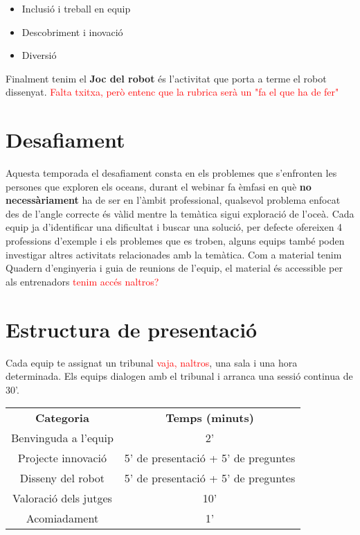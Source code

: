 \documentclass{article}
\newcommand\dubtes[1]{\textcolor{red}{#1}}
\begin{document}
\begin{itemize}
    \item Inclusió i treball en equip
    \item Descobriment i inovació
    \item Diversió
\end{itemize}

Finalment tenim el \textbf{Joc del robot} és l'activitat que porta a terme el robot dissenyat. \dubtes{Falta txitxa, però entenc que la rubrica serà un "fa el que ha de fer"}


\section{Desafiament}

Aquesta temporada el desafiament consta en els problemes que s'enfronten les persones que exploren els oceans, durant el webinar fa èmfasi en què \textbf{no necessàriament} ha de ser en l'àmbit professional, qualsevol problema enfocat des de l'angle correcte és vàlid mentre la temàtica sigui exploració de l'oceà.
\hfill \break\hfill \break
Cada equip ja d’identificar una dificultat i buscar una solució, per defecte ofereixen 4 professions d’exemple i els problemes que es troben, alguns equips també poden investigar altres activitats relacionades amb la temàtica. Com a material tenim Quadern d'enginyeria i guia de reunions de l'equip, el material és accessible per als entrenadors \dubtes{tenim accés naltros?}


\section{Estructura de presentació}

Cada equip te assignat un tribunal \dubtes{vaja, naltros}, una sala i una hora determinada. Els equips dialogen amb el tribunal i arranca una sessió continua de 30’.

\hfill \break\hfill \break
\begin{tabular}{ |c|c| } 

 \hline

 \textbf{Categoria} & \textbf{Temps (minuts)} \\ 

 Benvinguda a l'equip  & 2'  \\ 

 Projecte innovació & 5' de presentació + 5' de preguntes   \\ 

 Disseny del robot & 5' de presentació + 5' de preguntes  \\ 

 Valoració dels jutges & 10'  \\ 

 Acomiadament & 1'   \\ 

 \hline

\end{tabular}
\end{document}

